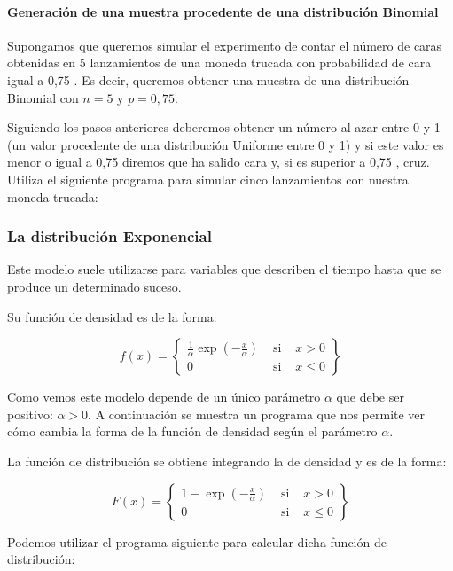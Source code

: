 \documentclass[
]{article}
\begin{document}
\paragraph{Generación de una muestra procedente de una distribución Binomial}\label{generaciuxf3n-de-una-muestra-procedente-de-una-distribuciuxf3n-binomial}

Supongamos que queremos simular el experimento de contar el número de caras obtenidas en 5 lanzamientos de una moneda trucada con probabilidad de cara igual a 0,75 . Es decir, queremos obtener una muestra de una distribución Binomial con \(n=5\) y \(p=0,75\).

Siguiendo los pasos anteriores deberemos obtener un número al azar entre 0 y 1 (un valor procedente de una distribución Uniforme entre 0 y 1) y si este valor es menor o igual a 0,75 diremos que ha salido cara y, si es superior a 0,75 , cruz. Utiliza el siguiente programa para simular cinco lanzamientos con nuestra moneda trucada:

\subsubsection{La distribución Exponencial}\label{la-distribuciuxf3n-exponencial}

Este modelo suele utilizarse para variables que describen el tiempo hasta que se produce un determinado suceso.

Su función de densidad es de la forma:

\[
f(x)=\left\{\begin{array}{lll}
\frac{1}{\alpha} \exp \left(-\frac{x}{\alpha}\right) & \text { si } & x>0 \\
0 & \text { si } & x \leq 0
\end{array}\right\}
\]

Como vemos este modelo depende de un único parámetro \(\alpha\) que debe ser positivo: \(\alpha>0\). A continuación se muestra un programa que nos permite ver cómo cambia la forma de la función de densidad según el parámetro \(\alpha\).

La función de distribución se obtiene integrando la de densidad y es de la forma:

\[
F(x)=\left\{\begin{array}{lll}
1-\exp \left(-\frac{x}{\alpha}\right) & \text { si } & x>0 \\
0 & \text { si } & x \leq 0
\end{array}\right\}
\]

Podemos utilizar el programa siguiente para calcular dicha función de distribución:
\end{document}
